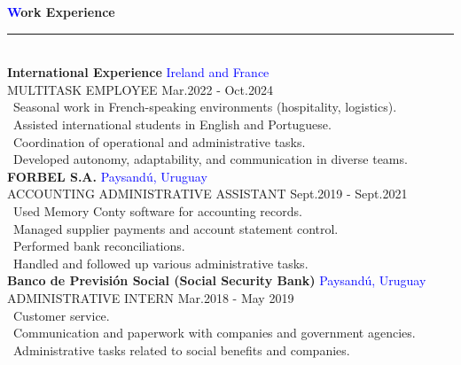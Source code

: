 \documentclass[a4paper,10pt]{article}
\begin{document}
\begin{spacing}{1.1}
\noindent
{\Large\textbf{\textcolor{blue}{W}ork Experience}}
\hspace{0.3em}\rule[0.9ex]{\dimexpr\textwidth-14em}{0.4pt} \\[6pt]
\textbf{International Experience} \hfill \textcolor{blue}{Ireland and France} \\
MULTITASK EMPLOYEE \hfill Mar.2022 - Oct.2024 \\ 
\textbullet \, Seasonal work in French-speaking environments (hospitality, logistics). \\
\textbullet \, Assisted international students in English and Portuguese.\\
\textbullet \, Coordination of operational and administrative tasks. \\
\textbullet \, Developed autonomy, adaptability, and communication in diverse teams. \\ [6pt]
\textbf{FORBEL S.A.} \hfill \textcolor{blue}{Paysandú, Uruguay} \\
ACCOUNTING ADMINISTRATIVE ASSISTANT \hfill Sept.2019 - Sept.2021 \\
\textbullet \, Used Memory Conty software for accounting records. \\
\textbullet \, Managed supplier payments and account statement control. \\
\textbullet \, Performed bank reconciliations. \\
\textbullet \, Handled and followed up various administrative tasks. \\ [6pt]
\textbf{Banco de Previsión Social (Social Security Bank)} \hfill \textcolor{blue}{Paysandú, Uruguay} \\ 
ADMINISTRATIVE INTERN \hfill Mar.2018 - May 2019 \\
\textbullet \, Customer service. \\
\textbullet \, Communication and paperwork with companies and government agencies. \\
\textbullet \, Administrative tasks related to social benefits and companies. \\


\end{spacing}
\end{document}
